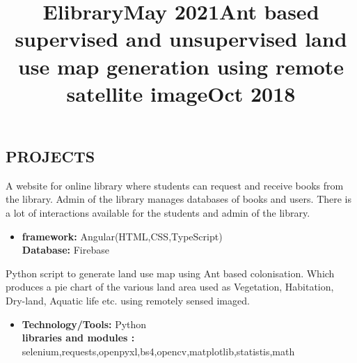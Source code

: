 \documentclass[margin]{res}
\begin{document}
\begin{resume}
\section{PROJECTS}
\location{}
\title{\textbf{Elibrary\hfill May 2021}}
\begin{position}
A website for online library where students can request and receive books from the library. Admin of the library manages databases of books and users. There is a lot of interactions available for the students and admin of the library. 
\begin{itemize}
\item \textbf{framework:} Angular(HTML,CSS,TypeScript)
\\
\textbf{Database: } Firebase
\end{itemize}
\end{position}


\title{\textbf{Ant based supervised and unsupervised land use map generation using remote satellite image\hfill Oct 2018}
 }
\begin{position}
Python script to generate land use map using Ant based colonisation. Which produces a pie chart of the various land area used as Vegetation, Habitation, Dry-land, Aquatic life etc. using remotely sensed imaged.  
\begin{itemize}
\item \textbf{Technology/Tools:} Python  
\\
\textbf{libraries and modules : } selenium,requests,openpyxl,bs4,opencv,matplotlib,statistis,math
\end{itemize}
\end{position}





\end{resume}
\(\)
\end{document}
